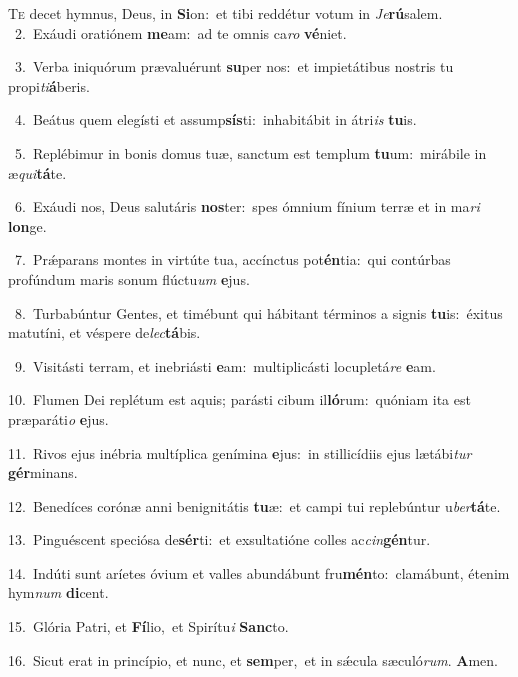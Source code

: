 \lettrine{\initial\textcolor{\initialcolor}{T}}{e} decet hymnus, Deus, in \textbf{Si}\-on:~\star et tibi reddétur votum in \textit{Je}\-\textbf{rú}salem.\\
{\numbfont\textcolor{\numbcolor}{~2.}}~Exáudi oratiónem \textbf{me}\-am:~\star ad te omnis ca\textit{ro} \textbf{vé}\-niet.\par
{\numbfont\textcolor{\numbcolor}{~3.}}~Verba iniquórum prævaluérunt \textbf{su}\-per nos:~\star et impietátibus nostris tu propi\-\textit{ti}\-\textbf{á}beris.\par
{\numbfont\textcolor{\numbcolor}{~4.}}~Beátus quem elegísti et assump\-\textbf{sís}\-ti:~\star inhabitábit in átri\textit{is} \textbf{tu}\-is.\par
{\numbfont\textcolor{\numbcolor}{~5.}}~Replébimur in bonis domus tuæ, sanctum est templum \textbf{tu}\-um:~\star mirábile in æ\-\textit{qui}\-\textbf{tá}te.\par
{\numbfont\textcolor{\numbcolor}{~6.}}~Exáudi nos, Deus salutáris \textbf{nos}\-ter:~\star spes ómnium fínium terræ et in ma\textit{ri} \textbf{lon}\-ge.\par
{\numbfont\textcolor{\numbcolor}{~7.}}~Prǽparans montes in virtúte tua, accínctus pot\-\textbf{én}\-tia:~\star qui contúrbas profúndum maris sonum flúctu\textit{um} \textbf{e}\-jus.\par
{\numbfont\textcolor{\numbcolor}{~8.}}~Turbabúntur Gentes, et timébunt qui hábitant términos a signis \textbf{tu}\-is:~\star éxitus matutíni, et véspere de\-\textit{lec}\-\textbf{tá}bis.\par
{\numbfont\textcolor{\numbcolor}{~9.}}~Visitásti terram, et inebriásti \textbf{e}\-am:~\star multiplicásti locupletá\textit{re} \textbf{e}\-am.\par
{\numbfont\textcolor{\numbcolor}{10.}}~Flumen Dei replétum est aquis; parásti cibum il\-\textbf{ló}\-rum:~\star quóniam ita est præparáti\textit{o} \textbf{e}\-jus.\par
{\numbfont\textcolor{\numbcolor}{11.}}~Rivos ejus inébria multíplica genímina \textbf{e}\-jus:~\star in stillicídiis ejus lætábi\textit{tur} \textbf{gér}\-minans.\par
{\numbfont\textcolor{\numbcolor}{12.}}~Benedíces corónæ anni benignitátis \textbf{tu}\-æ:~\star et campi tui replebúntur u\-\textit{ber}\-\textbf{tá}te.\par
{\numbfont\textcolor{\numbcolor}{13.}}~Pinguéscent speciósa de\-\textbf{sér}\-ti:~\star et exsultatióne colles ac\-\textit{cin}\-\textbf{gén}tur.\par
{\numbfont\textcolor{\numbcolor}{14.}}~Indúti sunt aríetes óvium et valles abundábunt fru\-\textbf{mén}\-to:~\star clamábunt, étenim hym\textit{num} \textbf{di}\-cent.\par
{\numbfont\textcolor{\numbcolor}{15.}}~Glória Patri, et \textbf{Fí}\-lio,~\star et Spirítu\textit{i} \textbf{Sanc}\-to.\par
{\numbfont\textcolor{\numbcolor}{16.}}~Sicut erat in princípio, et nunc, et \textbf{sem}\-per,~\star et in sǽcula sæculó\-\textit{rum}\-. \textbf{A}\-men.\par
